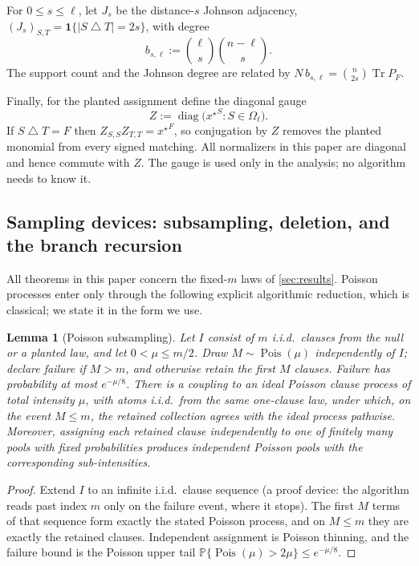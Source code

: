 \documentclass[11pt]{article}
\newtheorem{lemma}[lemma]{Lemma}
\theoremstyle{definition}
\theoremstyle{remark}
\newcommand{\bbP}{\mathbb P}
\newcommand{\1}{\mathbf 1}
\newcommand{\sd}{\mathbin{\triangle}}
\newcommand{\xstar}{{x^\star}}
\DeclareMathOperator{\Tr}{Tr}
\DeclareMathOperator{\diag}{diag}
\numberwithin{equation}{section}
\begin{document}
For $0\le s\le\ell$, let $J_s$ be the distance-$s$ Johnson adjacency,
$(J_s)_{S,T}=\1\{|S\sd T|=2s\}$, with degree
\begin{equation}\label{eq:johnson-degree}
 b_{s,\ell}:=\binom\ell s\binom{n-\ell}s.
\end{equation}
The support count and the Johnson degree are related by
$N\,b_{s,\ell}=\binom n{2s}\Tr P_F$.

Finally, for the planted assignment define the diagonal gauge
\begin{equation}\label{eq:gauge}
 Z:=\diag\bigl(\xstar^S:S\in\Omega_\ell\bigr).
\end{equation}
If $S\sd T=F$ then $Z_{S,S}Z_{T,T}=\xstar^F$, so conjugation by $Z$
removes the planted monomial from every signed matching.  All
normalizers in this paper are diagonal and hence commute with $Z$.  The
gauge is used only in the analysis; no algorithm needs to know it.

\subsection{Sampling devices: subsampling, deletion, and the branch
recursion}\label{sec:devices}

All theorems in this paper concern the fixed-$m$ laws of
\cref{sec:results}.  Poisson processes enter only through the following
explicit algorithmic reduction, which is classical; we state it in the
form we use.

\begin{lemma}[Poisson subsampling]\label{lem:subsample}
Let $I$ consist of $m$ i.i.d.\ clauses from the null or a planted law, and
let $0<\mu\le m/2$.  Draw $M\sim\operatorname{Pois}(\mu)$ independently of
$I$; declare failure if $M>m$, and otherwise retain the first $M$
clauses.  Failure has probability at most $e^{-\mu/8}$.  There is a
coupling to an ideal Poisson clause process of total intensity $\mu$,
with atoms i.i.d.\ from the same one-clause law, under which, on the
event $M\le m$, the retained collection agrees with the ideal process
\emph{pathwise}.  Moreover, assigning
each retained clause independently to one of finitely many pools with
fixed probabilities produces independent Poisson pools with the
corresponding sub-intensities.
\end{lemma}
\begin{proof}
Extend $I$ to an infinite i.i.d.\ clause sequence (a proof device: the
algorithm reads past index $m$ only on the failure event, where it
stops).  The first $M$ terms of that sequence form exactly the stated
Poisson process, and on $M\le m$ they are exactly the retained clauses.
Independent assignment is Poisson thinning, and the failure bound is
the Poisson upper tail
$\bbP\{\operatorname{Pois}(\mu)>2\mu\}\le e^{-\mu/8}$.
\end{proof}
\end{document}
